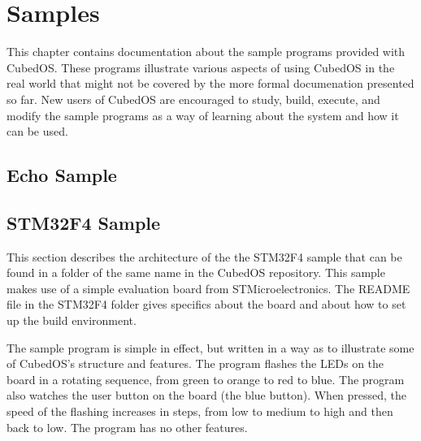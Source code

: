 
\chapter{Samples}
\label{chapt:samples}

This chapter contains documentation about the sample programs provided with Cubed\-OS. These
programs illustrate various aspects of using CubedOS in the real world that might not be
covered by the more formal documenation presented so far. New users of CubedOS are encouraged to
study, build, execute, and modify the sample programs as a way of learning about the system and
how it can be used.

\section{Echo Sample}
\label{sec:echo-sample}


\section{STM32F4 Sample}
\label{sec:stm32f4-sample}

This section describes the architecture of the the STM32F4 sample that can be found in a folder
of the same name in the CubedOS repository. This sample makes use of a simple evaluation board
from STMicroelectronics. The README file in the STM32F4 folder gives specifics about the board
and about how to set up the build environment.

The sample program is simple in effect, but written in a way as to illustrate some of CubedOS's
structure and features. The program flashes the LEDs on the board in a rotating sequence, from
green to orange to red to blue. The program also watches the user button on the board (the blue
button). When pressed, the speed of the flashing increases in steps, from low to medium to high
and then back to low. The program has no other features.

